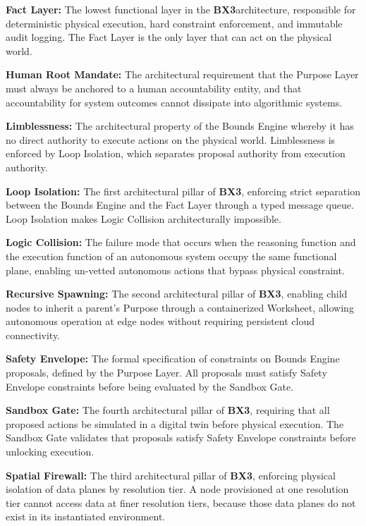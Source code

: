 \documentclass[12pt]{article}
\newcommand{\bxthree}{\textbf{BX3}}
\begin{document}
\textbf{Fact Layer:} The lowest functional layer in the \bxthree architecture, responsible for deterministic physical execution, hard constraint enforcement, and immutable audit logging. The Fact Layer is the only layer that can act on the physical world.

\textbf{Human Root Mandate:} The architectural requirement that the Purpose Layer must always be anchored to a human accountability entity, and that accountability for system outcomes cannot dissipate into algorithmic systems.

\textbf{Limblessness:} The architectural property of the Bounds Engine whereby it has no direct authority to execute actions on the physical world. Limblessness is enforced by Loop Isolation, which separates proposal authority from execution authority.

\textbf{Loop Isolation:} The first architectural pillar of \bxthree, enforcing strict separation between the Bounds Engine and the Fact Layer through a typed message queue. Loop Isolation makes Logic Collision architecturally impossible.

\textbf{Logic Collision:} The failure mode that occurs when the reasoning function and the execution function of an autonomous system occupy the same functional plane, enabling un-vetted autonomous actions that bypass physical constraint.

\textbf{Recursive Spawning:} The second architectural pillar of \bxthree, enabling child nodes to inherit a parent's Purpose through a containerized Worksheet, allowing autonomous operation at edge nodes without requiring persistent cloud connectivity.

\textbf{Safety Envelope:} The formal specification of constraints on Bounds Engine proposals, defined by the Purpose Layer. All proposals must satisfy Safety Envelope constraints before being evaluated by the Sandbox Gate.

\textbf{Sandbox Gate:} The fourth architectural pillar of \bxthree, requiring that all proposed actions be simulated in a digital twin before physical execution. The Sandbox Gate validates that proposals satisfy Safety Envelope constraints before unlocking execution.

\textbf{Spatial Firewall:} The third architectural pillar of \bxthree, enforcing physical isolation of data planes by resolution tier. A node provisioned at one resolution tier cannot access data at finer resolution tiers, because those data planes do not exist in its instantiated environment.
\end{document}
